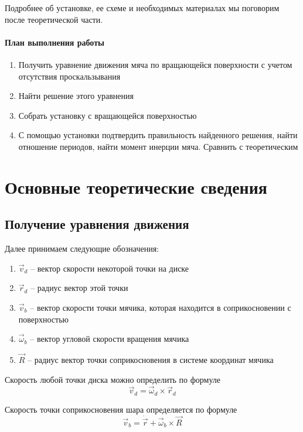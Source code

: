 \documentclass[a4paper,12pt]{article}
\begin{document}
	Подробнее об установке, ее схеме и необходимых материалах мы поговорим после теоретической части.

	\paragraph{План выполнения работы}
	\begin{enumerate}
		\item Получить уравнение движения мяча по вращающейся поверхности с учетом отсутствия проскальзывания\\
		\item Найти решение этого уравнения\\
		\item Собрать установку с вращающейся поверхностью\\
		\item С помощью установки подтвердить правильность найденного решения, найти отношение периодов, найти момент инерции мяча. Сравнить с теоретическим
	\end{enumerate}
	
	\section{Основные теоретические сведения}
	
	\subsection{Получение уравнения движения}
	Далее принимаем следующие обозначения:
	\begin{enumerate}
		\item $\vec{v}_d$ -- вектор скорости некоторой точки на диске
		\item $\vec{r}_d$ -- радиус вектор этой точки
		\item $\vec{v}_b$ -- вектор скорости точки мячика, которая находится в соприкосновении с поверхностью
		\item $\vec{\omega}_b$ -- вектор угловой скорости вращения мячика
		\item $\vec{R}$ -- радиус вектор точки соприкосновения в системе координат мячика
	\end{enumerate}
	Скорость любой точки диска можно определить по формуле
	\begin{equation}
		\label{v_d}
		\vec{v}_d=\vec{\omega}_d\times\vec{r}_d
	\end{equation}
	
	Скорость точки соприкосновения шара определяется по формуле
	\begin{equation}
		\label{v_b}
		\vec{v}_b=\dot{\vec{r}}+\vec{\omega}_b\times\vec{R}
	\end{equation}
	
\end{document}

